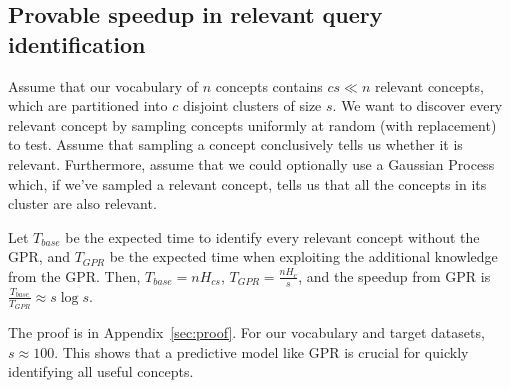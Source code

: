 \subsection{Provable speedup in relevant query identification}
\label{subsec:provable_speedup}
Assume that our vocabulary of $n$ concepts contains $cs \ll n $ relevant concepts, which are partitioned into $c$ disjoint clusters of size $s$. We want to discover every relevant concept by sampling concepts uniformly at random (with replacement) to test. Assume that sampling a concept conclusively tells us whether it is relevant. Furthermore, assume that we could optionally use a Gaussian Process which, if we've sampled a relevant concept, tells us that all the concepts in its cluster are also relevant. 
\begin{lemma}
\label{lemma:1}
Let $T_{base}$ be the expected time to identify every relevant concept without the GPR, and $T_{GPR}$ be the expected time when exploiting the additional knowledge from the GPR. Then, $T_{base} = n H_{cs}$, $T_{GPR} = \frac{nH_{c}}{s}$, and the speedup from GPR is $\frac{T_{base}}{T_{GPR}} \approx s \log s$.
\end{lemma}
The proof is in Appendix~\ref{sec:proof}. For our vocabulary and target datasets, $s \approx 100$. This shows that a predictive model like GPR is crucial for quickly identifying all useful concepts. 

